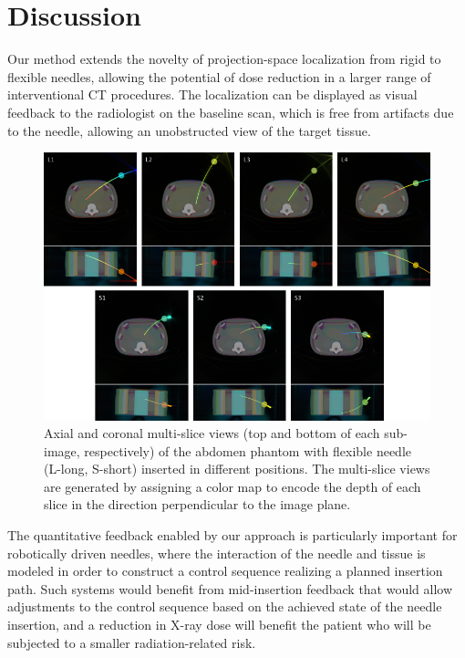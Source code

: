 \section*{Discussion}
Our method extends the novelty of projection-space localization from rigid to flexible needles, allowing the potential of dose reduction in a larger range of interventional CT procedures. The localization can be displayed as visual feedback to the radiologist on the baseline scan, which is free from artifacts due to the needle, allowing an unobstructed view of the target tissue.

\begin{figure}
\centering
\includegraphics[width=\textwidth]{multislices.png}
\caption{\small{Axial and coronal multi-slice views (top and bottom of each sub-image, respectively) of the abdomen phantom with flexible needle (L-long, S-short) inserted in different positions. The multi-slice views are generated by assigning a color map to encode the depth of each slice in the direction perpendicular to the image plane.}}
\label{multislices_fig}
\end{figure}

The quantitative feedback enabled by our approach is particularly important for robotically driven needles, where the interaction of the needle and tissue is modeled in order to construct a control sequence realizing a planned insertion path. Such systems would benefit from mid-insertion feedback that would allow adjustments to the control sequence based on the achieved state of the needle insertion, and a reduction in X-ray dose will benefit the patient who will be subjected to a smaller radiation-related risk.


